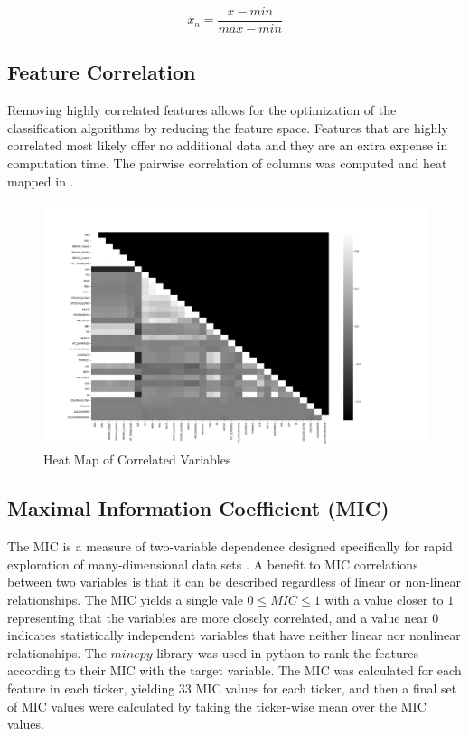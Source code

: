 \documentclass{article}\raggedbottom
\begin{document}
\begin{equation}\label{eq:norm}
	x_n = \frac{x - min}{max - min}
\end{equation}

\subsection{Feature Correlation}
Removing highly correlated features allows for the optimization of the classification algorithms by reducing the feature space. Features that are highly correlated most likely offer no additional data and they are an extra expense in computation time. The pairwise correlation of columns was computed and heat mapped in .

\begin{figure}[h!]
	\centering
	\includegraphics[width=\linewidth]{data/heatmapT1.png}
	\caption{Heat Map of Correlated Variables}
	\label{fig:corr_heatmap}
\end{figure}

\subsection{Maximal Information Coefficient (MIC)}\raggedbottom
The MIC is a measure of two-variable dependence designed specifically for rapid exploration of many-dimensional data sets \cite{reshef2011detecting}. A benefit to MIC correlations between two variables is that it can be described regardless of linear or non-linear relationships. The MIC yields a single vale $0 \leq MIC \leq 1$ with a value closer to $1$ representing that the variables are more closely correlated, and a value near $0$ indicates statistically independent variables that have neither linear nor nonlinear relationships. The $minepy$ library was used in python to rank the features according to their MIC with the target variable. The MIC was calculated for each feature in each ticker, yielding 33 MIC values for each ticker, and then a final set of MIC values were calculated by taking the ticker-wise mean over the MIC values.
\end{document}
